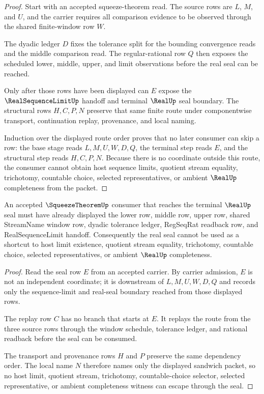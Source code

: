 \begin{proof}
Start with an accepted squeeze-theorem read. The source rows are $L$, $M$, and $U$, and the carrier requires all comparison evidence to be observed through the shared finite-window row $W$.

The dyadic ledger $D$ fixes the tolerance split for the bounding convergence reads and the middle comparison read. The regular-rational row $Q$ then exposes the scheduled lower, middle, upper, and limit observations before the real seal can be reached.

Only after those rows have been displayed can $E$ expose the $\RealSequenceLimitUp$ handoff and terminal $\RealUp$ seal boundary. The structural rows $H,C,P,N$ preserve that same finite route under componentwise transport, continuation replay, provenance, and local naming.

Induction over the displayed route order proves that no later consumer can skip a row: the base stage reads $L,M,U,W,D,Q$, the terminal step reads $E$, and the structural step reads $H,C,P,N$. Because there is no coordinate outside this route, the consumer cannot obtain host sequence limits, quotient stream equality, trichotomy, countable choice, selected representatives, or ambient $\RealUp$ completeness from the packet.
\end{proof}

\begin{theorem}
\label{thm:squeeze-theorem-real-seal-nonescape}
An accepted $\SqueezeTheoremUp$ consumer that reaches the terminal $\RealUp$ seal must have already displayed the lower row, middle row, upper row, shared StreamName window row, dyadic tolerance ledger, RegSeqRat readback row, and RealSequenceLimit handoff. Consequently the real seal cannot be used as a shortcut to host limit existence, quotient stream equality, trichotomy, countable choice, selected representatives, or ambient $\RealUp$ completeness.
\end{theorem}

\begin{proof}
Read the seal row $E$ from an accepted carrier. By carrier admission, $E$ is not an independent coordinate; it is downstream of $L,M,U,W,D,Q$ and records only the sequence-limit and real-seal boundary reached from those displayed rows.

The replay row $C$ has no branch that starts at $E$. It replays the route from the three source rows through the window schedule, tolerance ledger, and rational readback before the seal can be consumed.

The transport and provenance rows $H$ and $P$ preserve the same dependency order. The local name $N$ therefore names only the displayed sandwich packet, so no host limit, quotient stream, trichotomy, countable-choice selector, selected representative, or ambient completeness witness can escape through the seal.
\end{proof}

